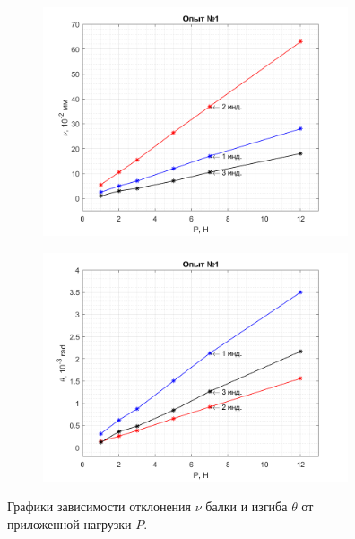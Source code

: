 \documentclass[12pt, a4paper]{article}
\begin{document}
    \begin{figure}[h!]
        \centering
        \hspace{-2cm}
        \begin{subfigure}{0.4\textwidth}
            \centering
            \includegraphics[width = 9cm]{figure_1.png}
        \end{subfigure}
        \hspace{1cm}
        \begin{subfigure}{0.4\textwidth}
            \centering
            \includegraphics[width = 9cm]{figure_2.png}
        \end{subfigure}
        \caption{\centering Графики зависимости отклонения $\nu$ балки и изгиба $\theta$ от приложенной нагрузки $P$.}
        \label{fig1}
    \end{figure} 
    
    \newpage
    
\end{document}
